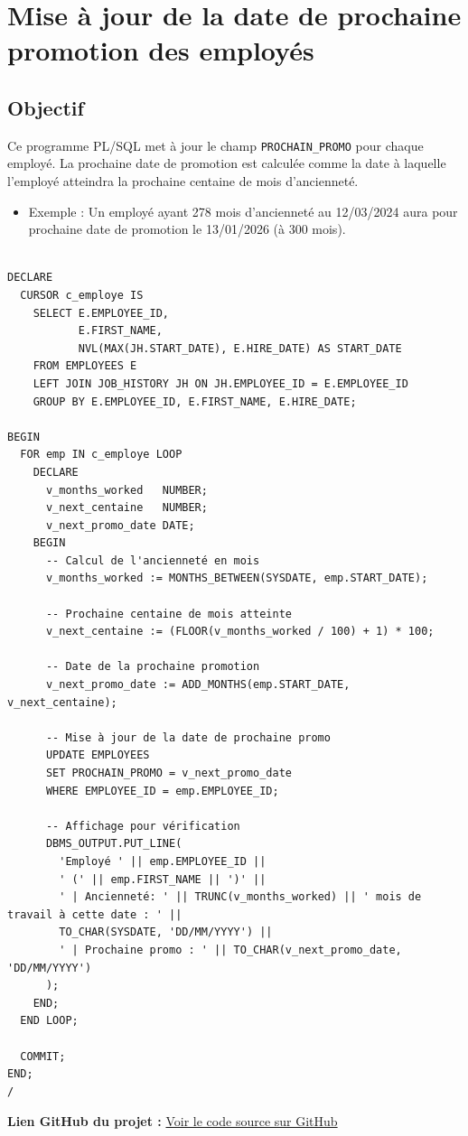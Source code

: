 \documentclass[12pt,a4paper]{article}
\begin{document}
    \section{Mise à jour de la date de prochaine promotion des employés}

\subsection*{Objectif}
Ce programme PL/SQL met à jour le champ \texttt{PROCHAIN\_PROMO} pour chaque employé.  
La prochaine date de promotion est calculée comme la date à laquelle l’employé atteindra la prochaine centaine de mois d’ancienneté.

\begin{itemize}
  \item Exemple : Un employé ayant 278 mois d'ancienneté au 12/03/2024 aura pour prochaine date de promotion le 13/01/2026 (à 300 mois).
\end{itemize}

\vspace{0.5cm}

\begin{lstlisting}[style=plsql]

DECLARE
  CURSOR c_employe IS
    SELECT E.EMPLOYEE_ID,
           E.FIRST_NAME,
           NVL(MAX(JH.START_DATE), E.HIRE_DATE) AS START_DATE
    FROM EMPLOYEES E
    LEFT JOIN JOB_HISTORY JH ON JH.EMPLOYEE_ID = E.EMPLOYEE_ID
    GROUP BY E.EMPLOYEE_ID, E.FIRST_NAME, E.HIRE_DATE;

BEGIN
  FOR emp IN c_employe LOOP
    DECLARE
      v_months_worked   NUMBER;
      v_next_centaine   NUMBER;
      v_next_promo_date DATE;
    BEGIN
      -- Calcul de l'ancienneté en mois
      v_months_worked := MONTHS_BETWEEN(SYSDATE, emp.START_DATE);
      
      -- Prochaine centaine de mois atteinte
      v_next_centaine := (FLOOR(v_months_worked / 100) + 1) * 100;
      
      -- Date de la prochaine promotion
      v_next_promo_date := ADD_MONTHS(emp.START_DATE, v_next_centaine);

      -- Mise à jour de la date de prochaine promo
      UPDATE EMPLOYEES
      SET PROCHAIN_PROMO = v_next_promo_date
      WHERE EMPLOYEE_ID = emp.EMPLOYEE_ID;

      -- Affichage pour vérification
      DBMS_OUTPUT.PUT_LINE(
        'Employé ' || emp.EMPLOYEE_ID || 
        ' (' || emp.FIRST_NAME || ')' ||
        ' | Ancienneté: ' || TRUNC(v_months_worked) || ' mois de travail à cette date : ' ||
        TO_CHAR(SYSDATE, 'DD/MM/YYYY') ||
        ' | Prochaine promo : ' || TO_CHAR(v_next_promo_date, 'DD/MM/YYYY')
      );
    END;
  END LOOP;

  COMMIT;
END;
/
\end{lstlisting}

\noindent\textbf{Lien GitHub du projet :} \href{https://github.com/Rahal-Lyes/plsql-cursor}{Voir le code source sur GitHub}
\end{document}
